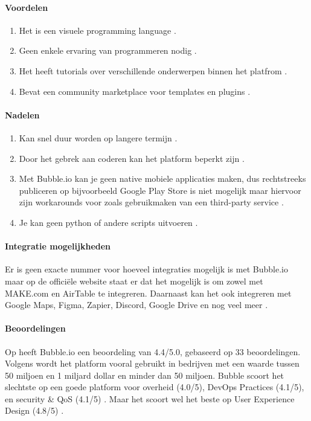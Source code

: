 \paragraph*{Voordelen}
\begin{enumerate}
    \item Het is een visuele programming language \autocite{Minor2022}.
    \item Geen enkele ervaring van programmeren nodig \autocite{Minor2022}.
    \item Het heeft tutorials over verschillende onderwerpen binnen het platfrom \autocite{Minor2022}.
    \item Bevat een community marketplace voor templates en plugins \autocite{Minor2022}.
\end{enumerate}


\paragraph*{Nadelen}
\begin{enumerate}
    \item Kan snel duur worden op langere termijn \autocite{Minor2022}.
    \item Door het gebrek aan coderen kan het platform beperkt zijn \autocite{Minor2022}.
    \item Met Bubble.io kan je geen native mobiele applicaties maken, dus rechtstreeks publiceren op bijvoorbeeld Google Play Store is niet mogelijk
    maar hiervoor zijn workarounds voor zoals gebruikmaken van een third-party service \autocite{Sharma2022}.
    \item Je kan geen python of andere scripts uitvoeren \autocite{Sharma2022}.
\end{enumerate}

\paragraph{Integratie mogelijkheden}
Er is geen exacte nummer voor hoeveel integraties mogelijk is met Bubble.io maar op de officiële website \textcite{Bubble2024a} 
staat er dat het mogelijk is om zowel met MAKE.com en AirTable te integreren. Daarnaast kan het ook integreren met Google Maps, Figma, Zapier, Discord, Google Drive en nog veel meer \autocite{Bubble2024a}.

\paragraph{Beoordelingen}
Op \textcite{Gartner2024} heeft Bubble.io een beoordeling van 4.4/5.0, gebaseerd op 33 beoordelingen. Volgens \textcite{Gartner2024}
wordt het platform vooral gebruikt in bedrijven met een waarde tussen 50 miljoen en 1 miljard dollar en minder dan 50 miljoen.
Bubble scoort het slechtste op een goede platform voor overheid (4.0/5), DevOps Practices (4.1/5), en security \& QoS  (4.1/5) \autocite{Gartner2024}. Maar het scoort wel
het beste op User Experience Design (4.8/5)  \autocite{Gartner2024}.

